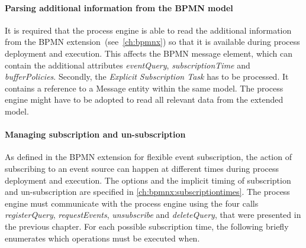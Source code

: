 \paragraph{Parsing additional information from the BPMN model}
It is required that the process engine is able to read the additional information from the BPMN extension~(see~\autoref{ch:bpmnx}) so that it is available during process deployment and execution.
This affects the BPMN message element, which can contain the additional attributes \textit{eventQuery}, \textit{subscriptionTime} and \textit{bufferPolicies}.
Secondly, the \textit{Explicit Subscription Task} has to be processed. It contains a reference to a Message entity within the same model.
The process engine might have to be adopted to read all relevant data from the extended model.


\paragraph{Managing subscription and un-subscription}
As defined in the BPMN extension for flexible event subscription, the action of subscribing to an event source can happen at different times during process deployment and execution. The options and the implicit timing of subscription and un-subscription are specified in \autoref{ch:bpmnx:subscriptiontimes}.
The process engine must communicate with the process engine using the four calls \textit{registerQuery}, \textit{requestEvents}, \textit{unsubscribe} and \textit{deleteQuery}, that were presented in the previous chapter.
For each possible subscription time, the following briefly enumerates which operations must be executed when. 

